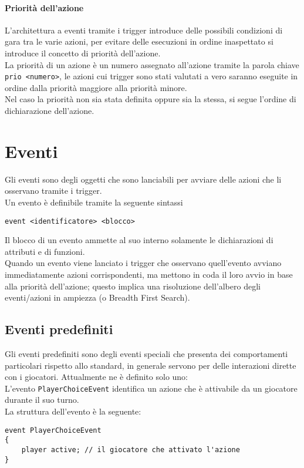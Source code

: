 \paragraph{Priorità dell'azione}
L'architettura a eventi tramite i trigger introduce delle possibili condizioni di gara tra le varie azioni,
per evitare delle esecuzioni in ordine inaspettato si introduce il concetto di priorità dell'azione. \\
La priorità di un azione è un numero assegnato all'azione tramite la parola chiave \verb|prio <numero>|,
le azioni cui trigger sono stati valutati a vero saranno eseguite in ordine dalla priorità maggiore
alla priorità minore. \\
Nel caso la priorità non sia stata definita oppure sia la stessa, si segue l'ordine di dichiarazione dell'azione.

\section{Eventi}
Gli eventi sono degli oggetti che sono lanciabili per avviare delle azioni che li osservano tramite i trigger. \\
Un evento è definibile tramite la seguente sintassi
\begin{lstlisting}
event <identificatore> <blocco>
\end{lstlisting}
Il blocco di un evento ammette al suo interno solamente le dichiarazioni di attributi e di funzioni. \\
Quando un evento viene lanciato i trigger che osservano quell'evento avviano immediatamente azioni corrispondenti,
ma mettono in coda il loro avvio in base alla priorità dell'azione; questo implica
una risoluzione dell'albero degli eventi/azioni in ampiezza (o Breadth First Search).

\subsection{Eventi predefiniti}
Gli eventi predefiniti sono degli eventi speciali che presenta dei comportamenti particolari rispetto 
allo standard, in generale servono per delle interazioni dirette con i giocatori.
Attualmente ne è definito solo uno: \\
L'evento \verb|PlayerChoiceEvent| identifica un azione che è attivabile da un giocatore durante il suo turno. \\
La struttura dell'evento è la seguente:
\begin{lstlisting}
event PlayerChoiceEvent
{
    player active; // il giocatore che attivato l'azione
}
\end{lstlisting}

